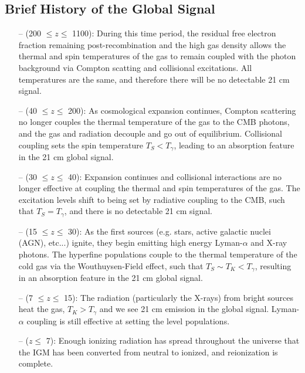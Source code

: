 \subsection{Brief History of the Global Signal}
\begin{itemize}
    \item[--] (200 $\leq z \leq$ 1100): During this time period, the residual 
     free electron fraction remaining post-recombination and the high gas 
     density allows the thermal and spin temperatures of the gas to remain 
     coupled with the photon background via Compton scatting and collisional 
     excitations. All temperatures are the same, and therefore there will be no 
     detectable 21 cm signal.
    \item[--] (40 $\leq z \leq$ 200): As cosmological expansion continues, 
     Compton scattering no longer couples the thermal temperature of the gas to 
     the CMB photons, and the gas and radiation decouple and go out of 
     equilibrium.  Collisional coupling sets the spin temperature $T_S < 
     T_\gamma$, leading to an absorption feature in the 21 cm global signal.  
    \item[--] (30 $\leq z \leq$ 40): Expansion continues and collisional 
     interactions are no longer effective at coupling the thermal and spin 
     temperatures of the gas. The excitation levels shift to being set by 
     radiative coupling to the CMB, such that $T_S = T_\gamma$, and there is no 
     detectable 21 cm signal.
    \item[--] (15 $\leq z \leq$ 30): As the first sources (e.g. stars, active 
     galactic nuclei (AGN), etc...) ignite, they begin emitting high energy 
     Lyman-$\alpha$ and X-ray photons. The hyperfine populations couple to the 
     thermal temperature of the cold gas via the Wouthuysen-Field effect, such 
     that $T_S \sim T_K < T_\gamma$, resulting in an absorption feature in the 
     21 cm global signal.
    \item[--] (7 $\leq z \leq$ 15): The radiation (particularly the X-rays) 
     from bright sources heat the gas, $T_K > T_\gamma$ and we see 21 cm 
     emission in the global signal. Lyman-$\alpha$ coupling is still effective 
     at setting the level populations.
    \item[--] ($z \leq$ 7): Enough ionizing radiation has spread throughout the 
     universe that the IGM has been converted from neutral to ionized, and 
     reionization is complete.
\end{itemize}

